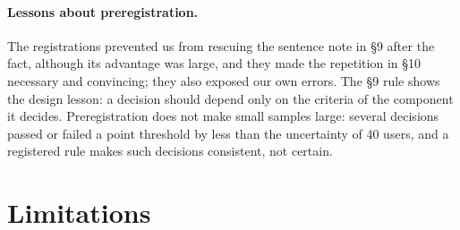 \documentclass[10pt,twocolumn]{article}
\begin{document}
\paragraph{Lessons about preregistration.} The registrations prevented us from rescuing the sentence note in \S9 after the
fact, although its advantage was large, and they made the repetition in \S10 necessary and convincing; they also
exposed our own errors. The \S9 rule shows the design lesson: a decision should depend only on the criteria of the
component it decides. Preregistration does not make small samples large: several decisions passed or failed a point
threshold by less than the uncertainty of 40 users, and a registered rule makes such decisions consistent, not certain.

\section{Limitations}\label{sec:limitations}
\end{document}
